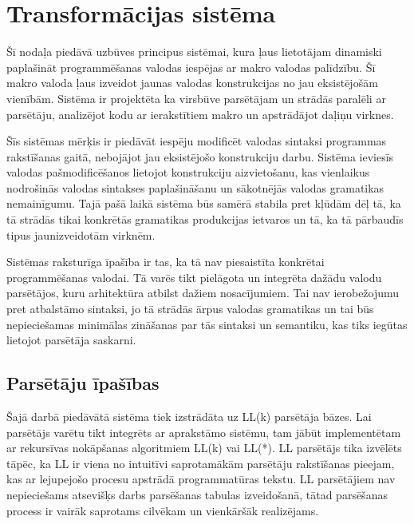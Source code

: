 \section{Transformācijas sistēma}
\label{s:system}

Šī nodaļa piedāvā uzbūves principus sistēmai, kura ļaus lietotājam dinamiski paplašināt programmēšanas valodas iespējas ar makro valodas palīdzību. Šī makro valoda ļaus izveidot jaunas valodas konstrukcijas no jau eksistējošām vienībām. Sistēma ir projektēta ka virsbūve parsētājam un strādās paralēli ar parsētāju, analizējot kodu ar ierakstītiem makro un apstrādājot daļiņu virknes.

Šīs sistēmas mērķis ir piedāvāt iespēju modificēt valodas sintaksi programmas rakstīšanas gaitā, nebojājot jau eksistējošo konstrukciju darbu. Sistēma ieviesīs valodas pašmodificēšanos lietojot konstrukciju aizvietošanu, kas vienlaikus nodrošinās valodas sintakses paplašināšanu un sākotnējās valodas gramatikas nemainīgumu. Tajā pašā laikā sistēma būs samērā stabila pret kļūdām dēļ tā, ka tā strādās tikai konkrētās gramatikas produkcijas ietvaros un tā, ka tā pārbaudīs tipus jaunizveidotām virknēm.

Sistēmas raksturīga īpašība ir tas, ka tā nav piesaistīta konkrētai programmēšanas valodai. Tā varēs tikt pielāgota un integrēta dažādu valodu parsētājos, kuru arhitektūra atbilst dažiem nosacījumiem. Tai nav ierobežojumu pret atbalstāmo sintaksi, jo tā strādās ārpus valodas gramatikas un tai būs nepieciešamas minimālas zināšanas par tās sintaksi un semantiku, kas tiks iegūtas lietojot parsētāja saskarni.


\subsection{\label{sbs:sys_parserqualities}Parsētāju īpašības}

Šajā darbā piedāvātā sistēma tiek izstrādāta uz LL(k) parsētāja bāzes. Lai parsētājs varētu tikt integrēts ar aprakstāmo sistēmu, tam jābūt implementētam ar rekursīvas nokāpšanas algoritmiem LL(k) vai LL(*). LL parsētājs tika izvēlēts tāpēc, ka LL ir viena no intuitīvi saprotamākām parsētāju rakstīšanas pieejam, kas ar lejupejošo procesu apstrādā programmatūras tekstu. LL parsētājiem nav nepieciešams atsevišķs darbs parsēšanas tabulas izveidošanā, tātad parsēšanas process ir vairāk saprotams cilvēkam un vienkāršāk realizējams.

